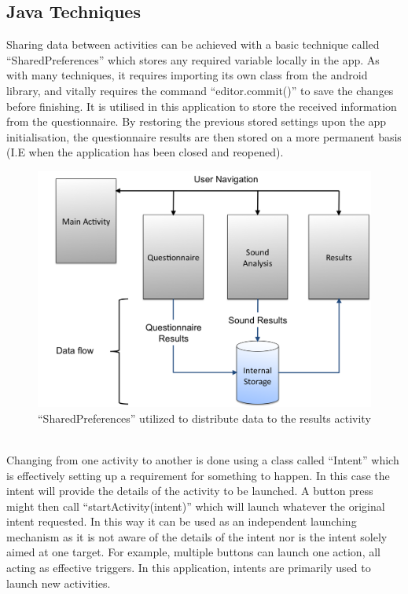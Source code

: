 \subsection{Java Techniques}
Sharing data between activities can be achieved with a basic technique called ``SharedPreferences'' which stores any required variable locally in the app. As with many techniques, it requires importing its own class from the android library, and vitally requires the command ``editor.commit()'' to save the changes before finishing. It is utilised in this application to store the received information from the questionnaire. By restoring the previous stored settings upon the app initialisation, the questionnaire results are then stored on a more permanent basis (I.E when the application has been closed and reopened).
\begin{figure}[ht!]
		\centering
			\includegraphics[width=.9\textwidth]{drawings/Data_Structure.png}
		\caption{``SharedPreferences'' utilized to distribute data to the results activity}
		\label{fig:dataStructure}
	\end{figure}
\\ Changing from one activity to another is done using a class called ``Intent'' which is effectively setting up a requirement for something to happen. In this case the intent will provide the details of the activity to be launched. A button press might then call ``startActivity(intent)'' which will launch whatever the original intent requested. In this way it can be used as an independent launching mechanism as it is not aware of the details of the intent nor is the intent solely aimed at one target. For example, multiple buttons can launch one action, all acting as effective triggers. In this application, intents are primarily used to launch new activities.
